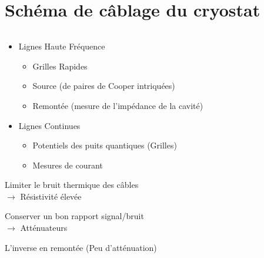 \documentclass[10pt,a9paper,handout]{beamer} \usepackage[utf8]{inputenc} \usepackage[francais]{babel} \usepackage[T1]{fontenc}
\begin{document}
\section{Schéma de câblage du cryostat}
\begin{frame}
    \begin{columns}[T]
    \begin{column}{0.6\textwidth}
    \begin{itemize}
        \item Lignes Haute Fréquence
        \begin{itemize}
            \item Grilles Rapides
            \item Source (de paires de Cooper intriquées)
            \item Remontée (mesure de l'impédance de la cavité)
        \end{itemize}
        \vspace{2mm}
        \item Lignes Continues
        \begin{itemize}
            \item Potentiels des puits quantiques (Grilles)
            \item Mesures de courant
        \end{itemize}
    \end{itemize}
    \vspace{5mm}
    
    Limiter le bruit thermique des câbles \\\qquad$\rightarrow$ Résistivité élevée
    \vspace{5mm}

    Conserver un bon rapport signal/bruit \\\qquad$\rightarrow$ Atténuateurs
    
    \vspace{5mm}
    L'inverse en remontée (Peu d'atténuation)



\end{column}
\end{columns}
\end{frame}
\end{document}
